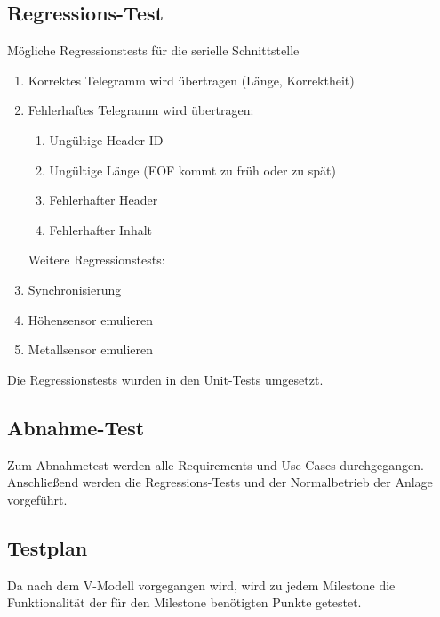 \documentclass[oneside,a4paper,titlepage]{scrartcl} %
\begin{document}
\subsection{Regressions-Test}
Mögliche Regressionstests für die serielle Schnittstelle
\begin{enumerate}
 \item Korrektes Telegramm wird übertragen (Länge, Korrektheit)
 \item Fehlerhaftes Telegramm wird übertragen:
 \begin{enumerate}
  \item Ungültige Header-ID
  \item Ungültige Länge (EOF kommt zu früh oder zu spät)
  \item Fehlerhafter Header
  \item Fehlerhafter Inhalt
 \end{enumerate}
 Weitere Regressionstests:
 \item Synchronisierung
 \item Höhensensor emulieren
 \item Metallsensor emulieren
\end{enumerate}
Die Regressionstests wurden in den Unit-Tests umgesetzt.

\subsection{Abnahme-Test}
Zum Abnahmetest werden alle Requirements und Use Cases durchgegangen. Anschließend werden
die Regressions-Tests und der Normalbetrieb der Anlage vorgeführt.

\subsection{Testplan}
Da nach dem V-Modell vorgegangen wird, wird zu jedem Milestone die Funktionalität der für den Milestone benötigten Punkte getestet.

\end{document}
